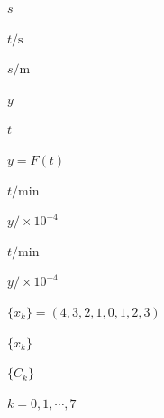 \documentclass[UTF8,fontset=fandol,a4paper]{ctexart}
\begin{document}
\noindent $s$\par

\noindent $t/\mathrm s$\par

\noindent $s/\mathrm m$\par

\noindent $y$\par

\noindent $t$\par

\noindent $y=F(t)$\par

\noindent $t/\mathrm{min}$\par

\noindent $y/\times10^{-4}$\par

\noindent $t/\mathrm{min}$\par

\noindent $y/\times10^{-4}$\par

\noindent $\{x_k\}=(4,3,2,1,0,1,2,3)$\par

\noindent $\{x_k\}$\par

\noindent $\{C_k\}$\par

\noindent $k=0,1,\cdots,7$\par
\end{document}
